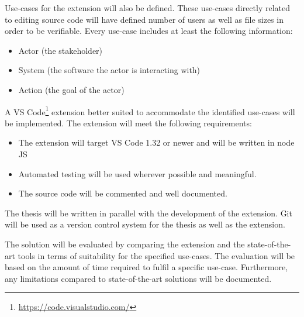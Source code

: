 Use-cases for the extension will also be defined. These use-cases directly related to editing source code will have defined number of users as well as file sizes in order to be verifiable. 
Every use-case includes at least the following information:
\begin{itemize}
    \item Actor (the stakeholder)
    \item System (the software the actor is interacting with)
    \item Action (the goal of the actor)
\end{itemize}
A VS Code\footnote{\href{https://code.visualstudio.com/}{https://code.visualstudio.com/}} extension better suited to accommodate the identified use-cases will be implemented.
The extension will meet the following requirements:
\begin{itemize}
    \item The extension will target VS Code 1.32 or newer and will be written in node JS
    \item Automated testing will be used wherever possible and meaningful.
    \item The source code will be commented and well documented.
\end{itemize}
The thesis will be written in parallel with the development of the extension. Git will be used as a version control system for the thesis as well as the extension.

The solution will be evaluated by comparing the extension and the state-of-the-art tools in terms of suitability for the specified use-cases. 
The evaluation will be based on the amount of time required to fulfil a specific use-case.
Furthermore, any limitations compared to state-of-the-art solutions will be documented.
